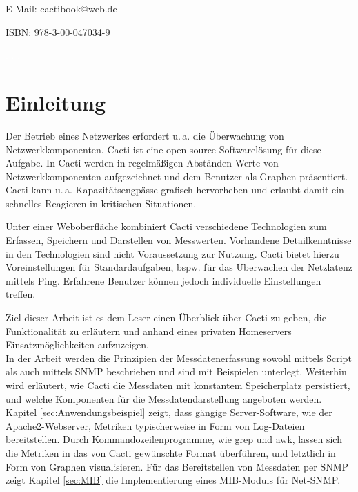 \documentclass[12pt,ngerman,toc=listofnumbered,toc=bibliographynumbered,toc=index,headsepline=true]{scrbook}
\begin{document}
\noindent\hspace*{42mm}%
E-Mail: cactibook@web.de

\noindent\hspace*{42mm}%
ISBN: 978-3-00-047034-9 

\textcolor{white}{.}
\textcolor{white}{.}
\textcolor{white}{.}

\tableofcontents
{}
\newpage
{}

\setlength{\parindent}{0pt} %
\setlength{\parskip}{1.0ex} %

\lstset{ %
basicstyle=\footnotesize,      %
tabsize=2,	                   %
breaklines=true,               %
breakatwhitespace=false,       %
showstringspaces=false
}



\chapter{Einleitung}
Der Betrieb eines Netzwerkes erfordert u.\,a. die Überwachung von
Netzwerkkomponenten. Cacti ist eine open-source Softwarelösung für diese
Aufgabe. In Cacti werden in regelmäßigen Abständen Werte von Netzwerkkomponenten
aufgezeichnet und dem Benutzer als Graphen präsentiert. Cacti kann u.\,a.
Kapazitätsengpässe grafisch hervorheben und erlaubt damit ein schnelles
Reagieren in kritischen Situationen.

Unter einer Weboberfläche kombiniert Cacti verschiedene Technologien zum
Erfassen, Speichern und Darstellen von Messwerten. Vorhandene Detailkenntnisse
in den Technologien sind nicht Voraussetzung zur Nutzung. Cacti bietet hierzu
Voreinstellungen für Standardaufgaben,  bspw. für das Überwachen der Netzlatenz
mittels Ping. Erfahrene Benutzer können jedoch individuelle Einstellungen
treffen.

Ziel dieser Arbeit ist es dem Leser einen Überblick über Cacti zu geben, die
Funktionalität zu erläutern und anhand eines privaten Homeservers
Einsatzmöglichkeiten aufzuzeigen.\\
In der Arbeit werden die Prinzipien der Messdatenerfassung sowohl mittels Script
als auch mittels SNMP beschrieben und sind mit Beispielen unterlegt. Weiterhin
wird erläutert, wie Cacti die Messdaten mit konstantem Speicherplatz
persistiert, und welche Komponenten für die Messdatendarstellung angeboten
werden.\\
Kapitel \ref{sec:Anwendungsbeispiel} zeigt, dass gängige
Server-Software, wie der Apache2-Webserver, Metriken typischerweise in Form von
Log-Dateien bereitstellen. Durch Kommandozeilenprogramme, wie grep und awk, lassen sich die
Metriken in das von Cacti gewünschte Format überführen, und letztlich in Form von Graphen
visualisieren. Für das Bereitstellen von Messdaten per SNMP zeigt Kapitel
\ref{sec:MIB} die Implementierung eines MIB-Moduls für Net-SNMP.
\end{document}
